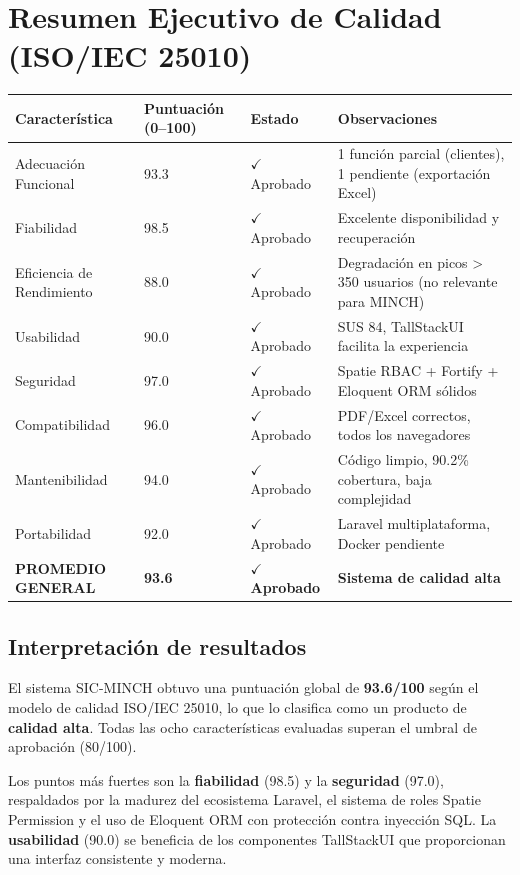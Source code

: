 \documentclass[stu]{apa7}
\begin{document}
\section{Resumen Ejecutivo de Calidad (ISO/IEC 25010)}

\begin{longtable}{|L{4.5cm}|C{2.5cm}|C{3.5cm}|L{5cm}|}
\hline
{}
\textbf{Característica} & \textbf{Puntuación (0--100)} & \textbf{Estado} & \textbf{Observaciones} \\
\hline
Adecuación Funcional & 93.3 & $\checkmark$ Aprobado & 1 función parcial (clientes), 1 pendiente (exportación Excel) \\
\hline
Fiabilidad & 98.5 & $\checkmark$ Aprobado & Excelente disponibilidad y recuperación \\
\hline
Eficiencia de Rendimiento & 88.0 & $\checkmark$ Aprobado & Degradación en picos > 350 usuarios (no relevante para MINCH) \\
\hline
Usabilidad & 90.0 & $\checkmark$ Aprobado & SUS 84, TallStackUI facilita la experiencia \\
\hline
Seguridad & 97.0 & $\checkmark$ Aprobado & Spatie RBAC + Fortify + Eloquent ORM sólidos \\
\hline
Compatibilidad & 96.0 & $\checkmark$ Aprobado & PDF/Excel correctos, todos los navegadores \\
\hline
Mantenibilidad & 94.0 & $\checkmark$ Aprobado & Código limpio, 90.2\% cobertura, baja complejidad \\
\hline
Portabilidad & 92.0 & $\checkmark$ Aprobado & Laravel multiplataforma, Docker pendiente \\
\hline
{}
\textbf{PROMEDIO GENERAL} & \textbf{93.6} & \textbf{$\checkmark$ Aprobado} & \textbf{Sistema de calidad alta} \\
\hline
\end{longtable}

\subsection{Interpretación de resultados}

El sistema SIC-MINCH obtuvo una puntuación global de \textbf{93.6/100} según el modelo de calidad ISO/IEC 25010, lo que lo clasifica como un producto de \textbf{calidad alta}. Todas las ocho características evaluadas superan el umbral de aprobación (80/100).

Los puntos más fuertes son la \textbf{fiabilidad} (98.5) y la \textbf{seguridad} (97.0), respaldados por la madurez del ecosistema Laravel, el sistema de roles Spatie Permission y el uso de Eloquent ORM con protección contra inyección SQL. La \textbf{usabilidad} (90.0) se beneficia de los componentes TallStackUI que proporcionan una interfaz consistente y moderna.
\end{document}
